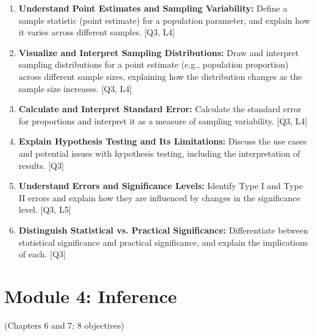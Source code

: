 \documentclass[12pt]{article}
\begin{document}
\begin{enumerate}
    \item \textbf{Understand Point Estimates and Sampling Variability:} Define a sample statistic (point estimate) for a population parameter, and explain how it varies across different samples. [Q3, L4] 
    \item \textbf{Visualize and Interpret Sampling Distributions:} Draw and interpret sampling distributions for a point estimate (e.g., population proportion) across different sample sizes, explaining how the distribution changes as the sample size increases. [Q3, L4] 
    \item \textbf{Calculate and Interpret Standard Error:} Calculate the standard error for proportions and interpret it as a measure of sampling variability. [Q3, L4]
    \item \textbf{Explain Hypothesis Testing and Its Limitations:} Discuss the use cases and potential issues with hypothesis testing, including the interpretation of results. [Q3]
    \item \textbf{Understand Errors and Significance Levels:} Identify Type I and Type II errors and explain how they are influenced by changes in the significance level. [Q3, L5]
    \item \textbf{Distinguish Statistical vs. Practical Significance:} Differentiate between statistical significance and practical significance, and explain the implications of each. [Q3]
\end{enumerate}

\newpage


\section{Module 4: Inference}
(Chapters 6 and 7; 8 objectives)

\end{document}
